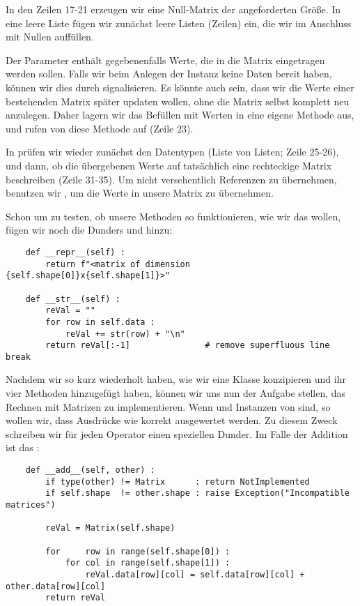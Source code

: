 In den Zeilen 17-21 erzeugen wir eine Null-Matrix der angeforderten Größe. In eine leere Liste fügen wir zunächst leere Listen (Zeilen) ein, die wir im Anschluss mit Nullen auffüllen.

Der Parameter  enthält gegebenenfalls Werte, die in die Matrix eingetragen werden sollen. Falls wir beim Anlegen der Instanz keine Daten bereit haben, können wir dies durch  signalisieren. Es könnte auch sein, dass wir die Werte einer bestehenden Matrix später updaten wollen, ohne die Matrix selbst komplett neu anzulegen. Daher lagern wir das Befüllen mit Werten in eine eigene Methode aus, und rufen von  diese Methode  auf (Zeile 23).

In  prüfen wir wieder zunächst den Datentypen (Liste von Listen; Zeile 25-26), und dann, ob die übergebenen Werte auf tatsächlich eine rechteckige Matrix beschreiben (Zeile 31-35). Um nicht versehentlich Referenzen zu übernehmen, benutzen wir , um die Werte in unsere Matrix zu übernehmen.

Schon um zu testen, ob unsere Methoden so funktionieren, wie wir das wollen, fügen wir noch die Dunders  und  hinzu:

\begin{codebox}[]
\begin{verbatim}
    def __repr__(self) :
        return f"<matrix of dimension {self.shape[0]}x{self.shape[1]}>"
    
    def __str__(self) :
        reVal = ""
        for row in self.data :
            reVal += str(row) + "\n"
        return reVal[:-1]               # remove superfluous line break
\end{verbatim}
\end{codebox}

Nachdem wir so kurz wiederholt haben, wie wir eine Klasse konzipieren und ihr vier Methoden hinzugefügt haben, können wir uns nun der Aufgabe stellen, das Rechnen mit Matrizen zu implementieren. Wenn  und  Instanzen von  sind, so wollen wir, dass Ausdrücke wie  korrekt ausgewertet werden. Zu diesem Zweck schreiben wir für jeden Operator einen speziellen Dunder. Im Falle der Addition ist das :

\begin{codebox}
\begin{verbatim}
    def __add__(self, other) :
        if type(other) != Matrix      : return NotImplemented
        if self.shape  != other.shape : raise Exception("Incompatible matrices")
        
        reVal = Matrix(self.shape)
        
        for     row in range(self.shape[0]) :
            for col in range(self.shape[1]) :
                reVal.data[row][col] = self.data[row][col] + other.data[row][col]
        return reVal
\end{verbatim}
\end{codebox}

